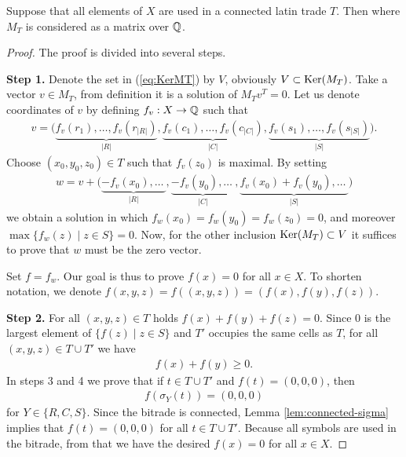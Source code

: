 \begin{lem}
Suppose that all elements of $X$ are used in a connected latin trade $T$. Then
%
where $M_T$ is considered as a matrix over $\mathbb Q$.
\end{lem}
\begin{proof}
The proof is divided into several steps.

%
%
\item \textbf{Step 1.}
Denote the set in (\ref{eq:KerMT}) by $V$, obviously $V \subset \mathop{\mathrm{Ker}}(M_T)$. Take a vector $v \in M_T$, from definition it is a solution of $M_Tv^T = 0$. Let us denote coordinates of $v$ by defining $f_v:X \rightarrow \mathbb Q$ such that
\begin{align}
	v = \big(\underbrace{f_v(r_1), \dots, f_v(r_{|R|})}_{|R|}, \underbrace{f_v(c_1), \dots, f_v(c_{|C|})}_{|C|}, \underbrace{f_v(s_1), \dots, f_v(s_{|S|})}_{|S|}\big).
\end{align}
Choose $(x_0, y_0, z_0) \in T$ such that $f_v(z_0)$ is maximal. By setting
\begin{align}
	w = v+\big(\underbrace{-f_v(x_0), \dots\ }_{|R|}, \underbrace{-f_v(y_0), \dots\ }_{|C|},\underbrace{f_v(x_0)+f_v(y_0), \dots\ }_{|S|}\big)
\end{align}
we obtain a solution in which $f_w(x_0) = f_w(y_0) = f_w(z_0) = 0$, and moreover $\max \{f_w(z) \mid z\in S\} = 0$. Now, for the other inclusion $\mathop{\mathrm{Ker}}(M_T) \subset V$ it suffices to prove that $w$ must be the zero vector.

Set $f=f_w$. Our goal is thus to prove $f(x) = 0$ for all $x \in X$. To shorten notation, we denote $f(x,y,z) = f((x,y,z)) = (f(x),f(y),f(z))$.

%
%
\item \textbf{Step 2.}
For all $(x,y,z) \in T$ holds $f(x)+f(y)+f(z)=0$. Since $0$ is the largest element of $\{f(z) \mid z \in S\}$ and $T'$ occupies the same cells as $T$, for all $(x,y,z) \in T \cup T'$ we have
\begin{align}
	f(x) + f(y) \geq 0.
\end{align}
In steps 3 and 4 we prove that if $t \in T\cup T'$ and $f(t) = (0,0,0)$, then
\begin{align}
	f(\sigma_Y(t)) = (0,0,0)
\end{align}
for $Y \in \{R, C, S\}$. Since the bitrade is connected, Lemma \ref{lem:connected-sigma} implies that $f(t) = (0,0,0)$ for all $t \in T \cup T'$. Because all symbols are used in the bitrade, from that we have the desired $f(x) = 0$ for all $x \in X$.


\end{proof}
